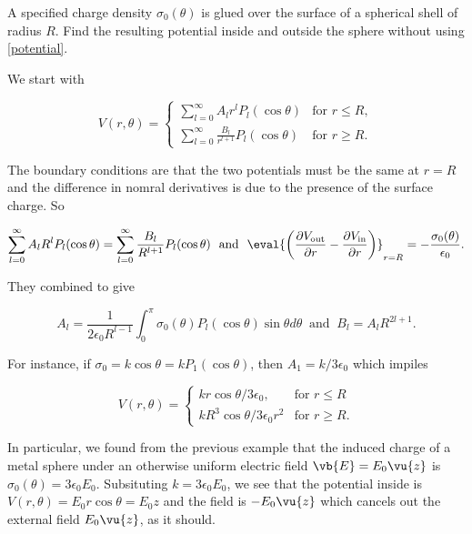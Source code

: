 \documentclass[english,a4paper,12pt]{report}
\begin{document}
{A specified charge density \(\sigma_0(\theta)\) is glued over the surface of a spherical shell of radius \(R\). Find the resulting potential inside and outside the sphere without using \cref{potential}.}
{We start with 

\begin{equation}
     V(r, \theta) =
    \begin{cases}
    \sum_{l=0}^{\infty} A_{l}r^{l}P_{l}(\cos \theta )    & \text{for } r \leq R, \\[10pt]
    \sum_{l=0}^{\infty} \frac{B_{l} }{r^{l+1} } P_{l}(\cos \theta ) & \text{for } r \geq R.
    \end{cases}  
\end{equation}

The boundary conditions are that the two potentials must be the same at \(r = R\) and the difference in nomral derivatives is due to the presence of the surface charge. So

\begin{equation}
    \sum_{l=0}^{\infty} A_{l}R^{l}P_{l}(\cos \theta ) = \sum_{l=0}^{\infty} \frac{B_{l} }{R^{l+1} } P_{l}(\cos \theta ) ~\text { and }~ \eval{\left( \frac{\partial V_{\text{out} } }{\partial r} - \frac{\partial V_{\text{in} } }{\partial r}   \right)}_{r=R}^{} = -\frac{\sigma _{0}(\theta ) }{\epsilon _{0} }.         
\end{equation}

They combined to give 

\begin{equation}
    A_{l} = \frac{1}{2\epsilon _{0}R^{l-1}  } \int_{0}^{\pi } \sigma _{0}(\theta ) P_{l}(\cos \theta ) \sin \theta d \theta ~\text { and }~ B_{l} = A_{l}R^{2l+1}.       
\end{equation}

For instance, if \(\sigma _{0} = k\cos \theta  = kP_1 (\cos \theta )\), then \(A_1  = k /3 \epsilon _{0} \) which impiles 

\begin{equation}
      V(r, \theta) =
    \begin{cases}
    kr \cos \theta / 3 \epsilon _{0}, & \text{for } r \leq R \\[10pt]
    kR^3 \cos \theta / 3\epsilon _{0}r^2  & \text{for } r \geq R.
    \end{cases}  
\end{equation}

In particular, we found from the previous example that the induced charge of a metal sphere under an otherwise uniform electric field \(\vb{E} = E_0 \vu{z} \) is \(\sigma _{0}(\theta ) = 3 \epsilon _{0}E_0   \). Subsituting \(k = 3 \epsilon _{0}E_0  \), we see that the potential inside is \(V(r,\theta ) = E_0 r \cos \theta = E_0 z\) and the field is \(- E_0 \vu{z} \) which cancels out the external field \(E_0 \vu{z} \), as it should.      
} 
\end{document}
